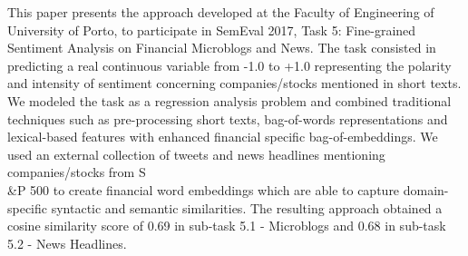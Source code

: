 This paper presents the approach developed at the Faculty of Engineering of University of Porto, to participate in SemEval 2017, Task 5: Fine-grained Sentiment Analysis on Financial Microblogs and News. The task consisted in predicting a real continuous variable from -1.0 to +1.0 representing the polarity and intensity of sentiment concerning companies/stocks mentioned in short texts. We modeled the task as a regression analysis problem and combined traditional techniques such as pre-processing short texts, bag-of-words representations and lexical-based features with enhanced financial specific bag-of-embeddings. We used an external collection of tweets and news headlines mentioning companies/stocks from S\\&P 500 to create financial word embeddings which are able to capture domain-specific syntactic and semantic similarities. The resulting approach obtained a cosine similarity score of 0.69 in sub-task 5.1 - Microblogs and 0.68 in sub-task 5.2 - News Headlines.
